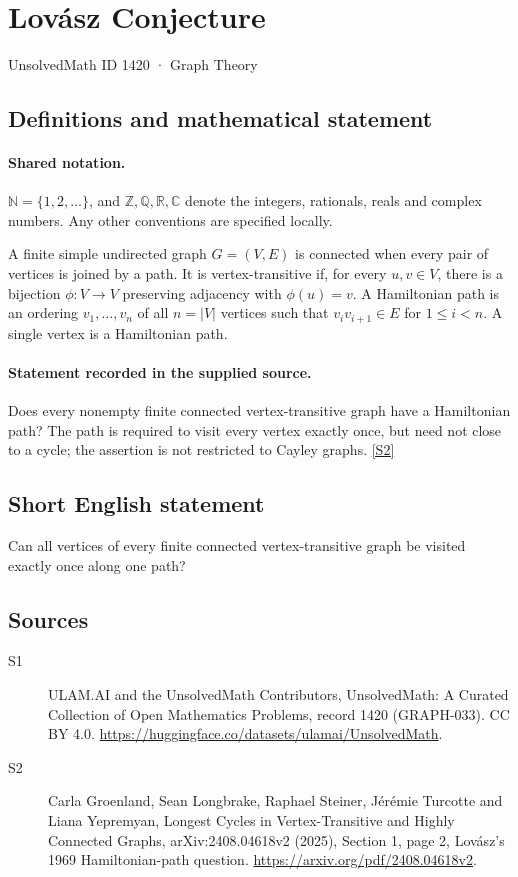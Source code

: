 \documentclass[11pt]{article}
\newcommand{\sref}[2]{\hyperlink{source:#1:#2}{[S#2]}}
\begin{document}
\setcounter{section}{1419}
\section{Lovász Conjecture}\label{1420}
{\small\sffamily UnsolvedMath ID 1420 · Graph Theory}
\subsection{Definitions and mathematical statement}

\paragraph{Shared notation.}$\mathbb N=\{1,2,\ldots\}$, and $\mathbb Z,\mathbb Q,\mathbb R,\mathbb C$ denote the integers, rationals, reals and complex numbers. Any other conventions are specified locally.


A finite simple undirected graph $G=(V,E)$ is connected when every pair of vertices is joined by a path. It is vertex-transitive if, for every $u,v\in V$, there is a bijection $\phi:V\to V$ preserving adjacency with $\phi(u)=v$. A Hamiltonian path is an ordering $v_1,\ldots,v_n$ of all $n=|V|$ vertices such that $v_iv_{i+1}\in E$ for $1\le i<n$. A single vertex is a Hamiltonian path.
\paragraph{Statement recorded in the supplied source.}
Does every nonempty finite connected vertex-transitive graph have a Hamiltonian path? The path is required to visit every vertex exactly once, but need not close to a cycle; the assertion is not restricted to Cayley graphs. \sref{1420}{2}
\subsection{Short English statement}
Can all vertices of every finite connected vertex-transitive graph be visited exactly once along one path?
\subsection{Sources}
\begin{description}
\item[\hypertarget{source:1420:1}{S1}] ULAM.AI and the UnsolvedMath Contributors, UnsolvedMath: A Curated Collection of Open Mathematics Problems, record 1420 (GRAPH-033). CC BY 4.0. \url{https://huggingface.co/datasets/ulamai/UnsolvedMath}.
\item[\hypertarget{source:1420:2}{S2}] Carla Groenland, Sean Longbrake, Raphael Steiner, Jérémie Turcotte and Liana Yepremyan, Longest Cycles in Vertex-Transitive and Highly Connected Graphs, arXiv:2408.04618v2 (2025), Section 1, page 2, Lovász’s 1969 Hamiltonian-path question. \url{https://arxiv.org/pdf/2408.04618v2}.
\end{description}
\label{end:1420}
\end{document}
